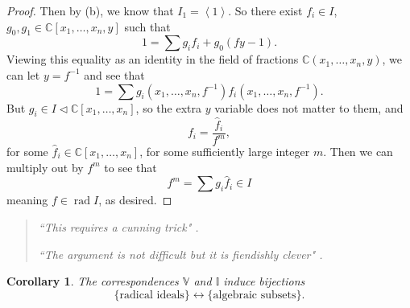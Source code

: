 \documentclass[letterpaper]{article}
\newtheorem{theorem}{Theorem}[section]
\newtheorem{corollary}[theorem]{Corollary}
\theoremstyle{definition}
\theoremstyle{remark}
\newcommand\CC{\mathbb{C}}
\newcommand\VV{\mathbb{V}}
\newcommand\II{\mathbb{I}}
\newcommand{\ideal}{\vartriangleleft}
\newcommand{\abrackets}[1]{\left\langle#1\right\rangle}
\DeclareMathOperator{\rad}{rad}
\begin{document}
\begin{proof}
	Then by (b), we know that \(I_1=\abrackets{1}\). So there exist \(f_i\in I\), \(g_0,g_1\in \CC[x_1,\dots,x_n,y]\) such that \[1=\sum g_if_i+g_0(fy-1).\] Viewing this equality as an identity in the field of fractions \(\CC(x_1,\dots,x_n,y)\), we can let \(y=f^{-1}\) and see that \[1=\sum g_i(x_1,\dots,x_n,f^{-1})f_i(x_1,\dots,x_n,f^{-1}).\] But \(g_i\in I\ideal\CC[x_1,\dots,x_n]\), so the extra \(y\) variable does not matter to them, and \[f_i=\frac{\hat{f}_i}{f^m},\] for some \(\hat{f}_i\in\CC[x_1,\dots,x_n]\), for some sufficiently large integer \(m\). Then we can multiply out by \(f^m\) to see that \[f^m=\sum g_i\hat{f}_i\in I\] meaning \(f\in\rad I\), as desired. 
\end{proof}
\begin{quote}
    \textit{``This requires a cunning trick" \cite{reid}.}
    
    \textit{``The argument is not difficult \textellipsis but it is fiendishly clever" \cite{aluffi}.}
\end{quote}

\begin{corollary}
    The correspondences $\VV$ and $\II$ induce bijections \[\{\text{radical ideals}\}\longleftrightarrow \{\text{algebraic subsets}\}.\]
\end{corollary}







\end{document}
